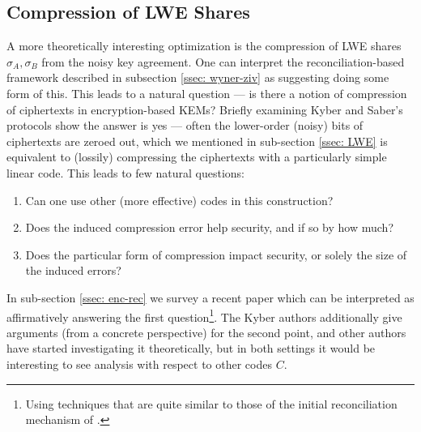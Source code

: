 \subsection{Compression of LWE Shares}\label{ssec: lwe-share-compression}
A more theoretically interesting optimization is the compression of LWE shares $\sigma_A, \sigma_B$ from the noisy key agreement.
One can interpret the reconciliation-based framework described in subsection \ref{ssec: wyner-ziv} as suggesting doing some form of this.
This leads to a natural question --- is there a notion of compression of ciphertexts in encryption-based KEMs?
Briefly examining Kyber and Saber's protocols show the answer is yes --- often the lower-order (noisy) bits of ciphertexts are zeroed out, which we mentioned in sub-section \ref{ssec: LWE} is equivalent to (lossily) compressing the ciphertexts with a particularly simple linear code.
This leads to few natural questions:
\begin{enumerate}
	\item Can one use other (more effective) codes in this construction?
	\item Does the induced compression error help security, and if so by how much?
	\item Does the particular form of compression impact security, or solely the size of the induced errors?
\end{enumerate}
In sub-section \ref{ssec: enc-rec} we survey a recent paper \cite{TCC:BDGM19} which can be interpreted as affirmatively answering the first question\footnote{Using techniques that are quite similar to those of the initial reconciliation mechanism of \cite{EPRINT:Ding12}.}.
The Kyber authors \cite{KYBER-spec} additionally give arguments (from a concrete perspective) for the second point, and other authors \cite{EC:Kim20} have started investigating it theoretically, but in both settings it would be interesting to see analysis with respect to other codes $C$.

